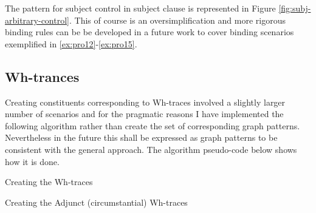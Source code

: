 The pattern for subject control in subject clause  is represented in Figure \ref{fig:subj-arbitrary-control}. This of course is an oversimplification and more rigorous binding rules can be be developed in a future work to cover binding scenarios exemplified in \ref{ex:pro12}-\ref{ex:pro15}.

\subsection{Wh-trances}

Creating constituents corresponding to Wh-traces involved a slightly larger number of scenarios and for the pragmatic reasons I have implemented the following algorithm rather than create the set of corresponding graph patterns. Nevertheless in the future this shall be expressed as graph patterns to be consistent with the general approach. The algorithm pseudo-code below shows how it is done. 


\begin{algorithm}[H]
	\Input { \dg, \cg}
	\caption{Creating the Wh-traces}
	\label{alg:create-wh-trace}
\end{algorithm}


\begin{algorithm}[!ht]
	\Input {\whGroup, \dg, \cg}
	\caption{Creating the Adjunct (circumstantial) Wh-traces}
	\label{alg:create-wh-adjunct-trace}
\end{algorithm}




